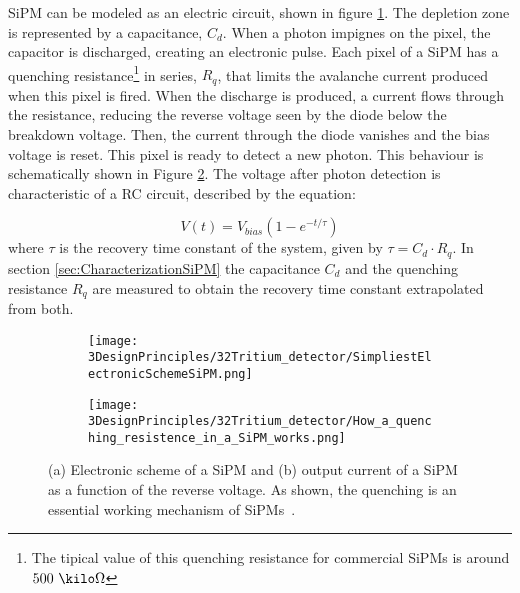 
SiPM can be modeled as an electric circuit, shown in figure \ref{subfig:ElectricModelSiPM}. The depletion zone is represented by a capacitance, $C_d$. When a photon impignes on the pixel, the capacitor is discharged, creating an electronic pulse. Each pixel of a SiPM has a quenching resistance\footnote{The tipical value of this quenching resistance for commercial SiPMs is around $500~\kilo\Omega$} in series, $R_q$, that limits the avalanche current produced when this pixel is fired. When the discharge is produced, a current flows through the resistance, reducing the reverse voltage seen by the diode below the breakdown voltage. Then, the current through the diode vanishes and the bias voltage is reset. This pixel is ready to detect a new photon. This behaviour is schematically shown in Figure \ref{subfig:HowSiPMworks}. The voltage after photon detection is characteristic of a RC circuit, described by the equation: 

\begin{equation}
V(t)=V_{bias}\left(1-e^{-t/\tau} \right)
\label{RCCircuitBiasVoltage}
\end{equation}
where $\tau$ is the recovery time constant of the system, given by $\tau=C_d \cdot{} R_q$. In section \ref{sec:CharacterizationSiPM} the capacitance $C_d$ and the quenching resistance $R_q$ are measured to obtain the recovery time constant extrapolated from both.

\begin{figure}
\centering
    \begin{subfigure}[]{0.45\textwidth}
    \centering
    \texttt{[image: 3DesignPrinciples/32Tritium\_detector/SimpliestElectronicSchemeSiPM.png]}  
    \caption{\label{subfig:ElectricModelSiPM}}
    \end{subfigure}
    \hfill
    \begin{subfigure}[]{0.45\textwidth}
    \centering
    \texttt{[image: 3DesignPrinciples/32Tritium\_detector/How\_a\_quenching\_resistence\_in\_a\_SiPM\_works.png]}  
    \caption{\label{subfig:HowSiPMworks}}
    \end{subfigure}
 \caption{(a) Electronic scheme of a SiPM and (b) output current of a SiPM as a function of the reverse voltage. As shown, the quenching is an essential working mechanism of SiPMs~\cite{DataSheetSensL}.}
 \label{fig:ChenchingResistance}
\end{figure}

